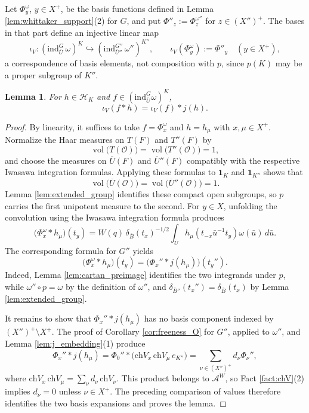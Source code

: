 \documentclass[12pt]{article}
\numberwithin{equation}{section}
\newtheorem{lemma}[theorem]{Lemma}
\theoremstyle{definition}
\theoremstyle{remark}
\theoremstyle{plain}
\begin{document}
Let $\Phi^\omega_y$, $y\in X^+$, be the basis functions defined in Lemma \ref{lem:whittaker_support}(2) for $G$, and put $\Phi''_z:=\Phi^{\omega''}_z$ for $z\in(X'')^+$. The bases in that part define an injective linear map
$$\iota_V : (\mathrm{ind}_{\overline{U}}^G\,\omega)^K \hookrightarrow (\mathrm{ind}_{\overline{U}''}^{G''}\,\omega'')^{K''}, \qquad \iota_V(\Phi^\omega_y) := \Phi''_y \quad (y \in X^+),$$
a correspondence of basis elements, not composition with $p$, since $p(K)$ may be a proper subgroup of $K''$.

\begin{lemma}\label{lem:transfer}
For $h \in \mathcal H_K$ and $f \in (\mathrm{ind}_{\overline U}^G\omega)^K$,
$$\iota_V(f*h)=\iota_V(f)*j(h).$$
\end{lemma}
\begin{proof}
By linearity, it suffices to take $f=\Phi^\omega_x$ and $h=h_\mu$ with $x,\mu\in X^+$. Normalize the Haar measures on $T(F)$ and $T''(F)$ by
$$\operatorname{vol}\bigl(T(\mathcal O)\bigr)
=\operatorname{vol}\bigl(T''(\mathcal O)\bigr)=1,$$
and choose the measures on $\overline U(F)$ and $\overline U''(F)$ compatibly with the respective Iwasawa integration formulas. Applying these formulas to $\mathbf 1_K$ and $\mathbf 1_{K''}$ shows that
$$\operatorname{vol}\bigl(\overline U(\mathcal O)\bigr)
=\operatorname{vol}\bigl(\overline U''(\mathcal O)\bigr)=1.$$
Lemma \ref{lem:extended_group} identifies these compact open subgroups, so $p$ carries the first unipotent measure to the second. For $y\in X$, unfolding the convolution using the Iwasawa integration formula produces
$$\big(\Phi^\omega_x*h_\mu\big)(t_y)
=W(q)\,\delta_{\overline B}(t_x)^{-1/2}
\int_{\overline U}h_\mu(t_{-x}\bar u^{-1}t_y)\omega(\bar u)\,d\bar u.$$
The corresponding formula for $G''$ yields
$$\big(\Phi^\omega_x*h_\mu\big)(t_y)=\bigl(\Phi_x''*j(h_\mu)\bigr)(t_y'').$$
Indeed, Lemma \ref{lem:cartan_preimage} identifies the two integrands under $p$, while $\omega''\circ p=\omega$ by the definition of $\omega''$, and $\delta_{\overline B''}(t_x'')=\delta_{\overline B}(t_x)$ by Lemma \ref{lem:extended_group}.

It remains to show that $\Phi_x''*j(h_\mu)$ has no basis component indexed by $(X'')^+\setminus X^+$. The proof of Corollary \ref{cor:freeness_O} for $G''$, applied to $\omega''$, and Lemma \ref{lem:j_embedding}(1) produce
$$\Phi_x''*j(h_\mu)
=\Phi_0''*\bigl(\mathrm{ch}V_x\,\mathrm{ch}V_\mu\,e_{K''}\bigr)
=\sum_{\nu\in(X'')^+}d_\nu\Phi_\nu'',$$
where $\mathrm{ch}V_x\,\mathrm{ch}V_\mu=\sum_\nu d_\nu\,\mathrm{ch}V_\nu$. This product belongs to $\mathcal A^W$, so Fact \ref{fact:chV}(2) implies $d_\nu=0$ unless $\nu\in X^+$. The preceding comparison of values therefore identifies the two basis expansions and proves the lemma.
\end{proof}
\end{document}
